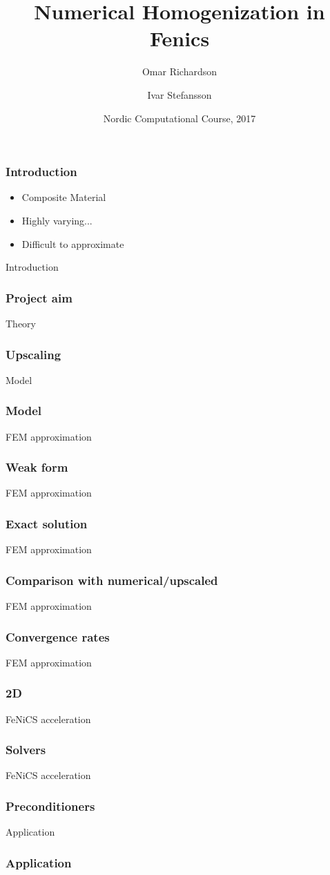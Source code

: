 \documentclass{beamer}
\title[Numerical homogenization]{Numerical Homogenization in Fenics}
\author[O. Richardson \and I. Stefansson] %
{Omar Richardson \and Ivar Stefansson}
\institute %
{
    Karlstad University, Sweden \and University of Bergen, Norway
}
\date[]{Nordic Computational Course, 2017}
\begin{document}
  \frame{\titlepage}
\begin{frame}
  \frametitle{Introduction}
  \begin{itemize}
    \item Composite Material
    \item Highly varying...
    \item Difficult to approximate
  \end{itemize}
\end{frame}

\begin{frame}[t]{Introduction}
  \frametitle{Project aim}
\end{frame}

\begin{frame}[t]{Theory}
  \frametitle{Upscaling}
\end{frame}

\begin{frame}[t]{Model}
  \frametitle{Model}
\end{frame}

\begin{frame}[t]{FEM approximation}
  \frametitle{Weak form}
\end{frame}

\begin{frame}[t]{FEM approximation}
  \frametitle{Exact solution}
\end{frame}

\begin{frame}[t]{FEM approximation}
  \frametitle{Comparison with numerical/upscaled}
\end{frame}

\begin{frame}[t]{FEM approximation}
  \frametitle{Convergence rates}
\end{frame}

\begin{frame}[t]{FEM approximation}
  \frametitle{2D}
\end{frame}

\begin{frame}[t]{FeNiCS acceleration}
  \frametitle{Solvers}
\end{frame}

\begin{frame}[t]{FeNiCS acceleration}
  \frametitle{Preconditioners}
\end{frame}

\begin{frame}[t]{Application}
  \frametitle{Application}
\end{frame}
\end{document}
